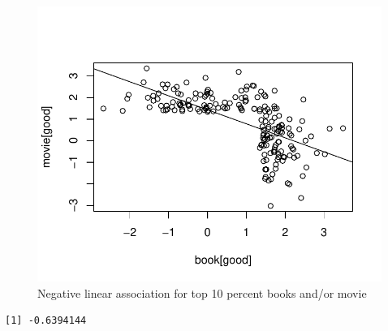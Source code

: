\begin{knitrout}
\color{fgcolor}\begin{kframe}
\begin{alltt}
 \hlkwb{<-}  \hlopt{>}  \hlstd{)}
 \hlkwb{<-}  \hlopt{>}  \hlstd{)}
  \hlkwb{<-}  \hlopt{|} 
 
\hlstd{(}\hlopt{~}
\end{alltt}
\end{kframe}\begin{figure}

{\centering \includegraphics[width=\maxwidth]{figure/datacollect-Berkson2-1} 

}

\caption[Negative linear association for top 10 percent books and/or movie]{Negative linear association for top 10 percent books and/or movie}\label{fig:datacollect-Berkson2}
\end{figure}

\begin{kframe}\begin{alltt}
\end{alltt}
\begin{verbatim}
[1] -0.6394144
\end{verbatim}
\end{kframe}
\end{knitrout}
